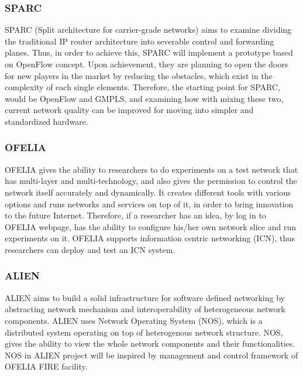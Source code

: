 \subsubsection{SPARC}

SPARC (Split architecture for carrier-grade networks) aims to examine dividing the traditional IP router architecture into severable control and forwarding planes. Thus, in order to achieve this, SPARC will implement a prototype based on OpenFlow concept. Upon achievement, they are planning to open the doors for new players in the market by reducing the obstacles, which exist in the complexity of each single elements. Therefore, the starting point for SPARC, would be OpenFlow and GMPLS, and examining how with mixing these two, current network quality can be improved for moving into simpler and standardized hardware. \cite{SPARCproject}

\subsubsection{OFELIA}

OFELIA gives the ability to researchers to do experiments on a test network that has multi-layer and multi-technology, and also gives the permission to control the network itself accurately and dynamically. It creates different tools with various options and runs networks and services on top of it, in order to bring innovation to the future Internet. Therefore, if a researcher has an idea, by log in to OFELIA webpage, has the ability to configure his/her own network slice and run experiments on it. OFELIA supports information centric networking (ICN), thus researchers can deploy and test an ICN system. \cite{OFELIAproject}   

\subsubsection{ALIEN}

ALIEN aims to  build a solid infrastructure for software defined networking by abstracting network mechanism and interoperability of heterogeneous network components. ALIEN uses Network Operating System (NOS), which is a distributed system operating on top of heterogenous network structure. NOS, gives the ability to view the whole network components and their functionalities. NOS in ALIEN project will be inspired by management and control framework of OFELIA FIRE facility. \cite{ALIENproject}

